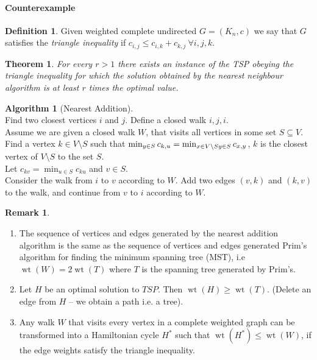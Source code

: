 \documentclass{article}
\newtheorem*{thm}{Theorem}
\theoremstyle{definition}
\newtheorem*{defn}{Definition}
\newtheorem*{rem}{Remark}
\newtheorem*{alg}{Algorithm}
\DeclareMathOperator{\wt}{wt}
\begin{document}
\paragraph{Counterexample}

\begin{defn}
Given weighted complete undirected $G=(K_n, c)$ we say that $G$ satisfies the \emph{triangle inequality} if $c_{i,j}\le c_{i,k} + c_{k,j}\ \forall i,j,k$.
\end{defn}

\begin{thm}
For every $r > 1$ there exists an instance of the TSP obeying the triangle inequality for which the solution obtained by the nearest neighbour algorithm is at least $r$ times the optimal value.
\end{thm}

\begin{alg}[Nearest Addition]~\\
Find two closest vertices $i$ and $j$.
Define a closed walk $i,j,i$. \\
Assume we are given a closed walk $W$, that visits all vertices in some set $S\subseteq V$.\\
\indent Find a vertex $k\in V\setminus S$ such that $\min_{y\in S} c_{k,u} = \min_{x\in V\setminus S \\ y\in S} c_{x,y}$, $k$ is the closest vertex of $V\setminus S$ to the set $S$. \\
\indent Let $c_{kv} = \min_{u\in S} c_{ku}$ and $v \in S$. \\
\indent Consider the walk from $i$ to $v$ according to $W$.
Add two edges $(v,k)$ and $(k,v)$ to the walk, and continue from $v$ to $i$ according to $W$.
\end{alg}

\begin{rem}
\begin{enumerate}
\item The sequence of vertices and edges generated by the nearest addition algorithm is the same as the sequence of vertices and edges generated Prim's algorithm for finding the minimum spanning tree (MST), i.e $\wt(W) = 2\wt(T)$ where $T$ is the spanning tree generated by Prim's.
\item Let $H$ be an optimal solution to $TSP$. Then $\wt(H) \ge \wt(T)$.
(Delete an edge from $H$ -- we obtain a path i.e. a tree).
\item Any walk $W$ that visits every vertex in a complete weighted graph can be transformed into a Hamiltonian cycle $H^*$ such that $\wt(H^*) \le \wt(W)$, if the edge weights satisfy the triangle inequality.
\end{enumerate}
\end{rem}
\end{document}
